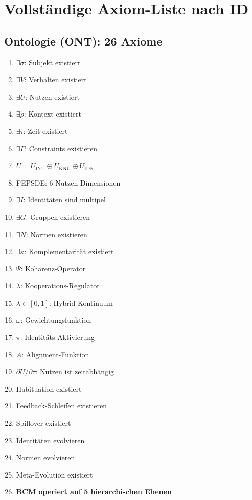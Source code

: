 \section{Vollständige Axiom-Liste nach ID}

\subsection{Ontologie (ONT): 26 Axiome}
\begin{enumerate}[label=MA-ONT-\arabic*:, leftmargin=3cm]
    \item $\exists \sigma$: Subjekt existiert
    \item $\exists V$: Verhalten existiert
    \item $\exists U$: Nutzen existiert
    \item $\exists \rho$: Kontext existiert
    \item $\exists \tau$: Zeit existiert
    \item $\exists \Gamma$: Constraints existieren
    \item $U = U_{\text{INU}} \oplus U_{\text{KNU}} \oplus U_{\text{IDN}}$
    \item FEPSDE: 6 Nutzen-Dimensionen
    \item $\exists I$: Identitäten sind multipel
    \item $\exists G$: Gruppen existieren
    \item $\exists N$: Normen existieren
    \item $\exists \kappa$: Komplementarität existiert
    \item $\Psi$: Kohärenz-Operator
    \item $\lambda$: Kooperations-Regulator
    \item $\lambda \in [0,1]$: Hybrid-Kontinuum
    \item $\omega$: Gewichtungsfunktion
    \item $\pi$: Identitäts-Aktivierung
    \item $A$: Alignment-Funktion
    \item $\partial U / \partial \tau$: Nutzen ist zeitabhängig
    \item Habituation existiert
    \item Feedback-Schleifen existieren
    \item Spillover existiert
    \item Identitäten evolvieren
    \item Normen evolvieren
    \item Meta-Evolution existiert
    \item \textbf{BCM operiert auf 5 hierarchischen Ebenen}
\end{enumerate}

